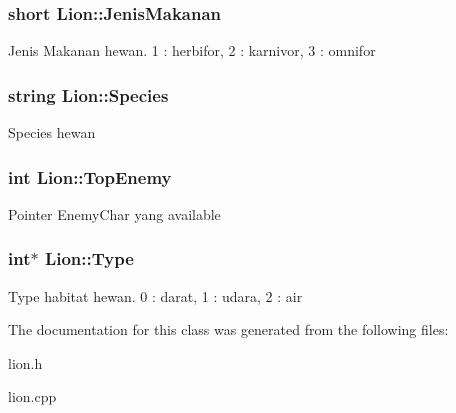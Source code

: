 \subsubsection[{\texorpdfstring{Jenis\+Makanan}{JenisMakanan}}]{\setlength{\rightskip}{0pt plus 5cm}short Lion\+::\+Jenis\+Makanan\hspace{0.3cm}{\ttfamily [protected]}}\hypertarget{class_lion_af7ca474c7731de58af3fef36ec9f2b49}{}\label{class_lion_af7ca474c7731de58af3fef36ec9f2b49}
Jenis Makanan hewan. 1 \+: herbifor, 2 \+: karnivor, 3 \+: omnifor 
\subsubsection[{\texorpdfstring{Species}{Species}}]{\setlength{\rightskip}{0pt plus 5cm}string Lion\+::\+Species\hspace{0.3cm}{\ttfamily [protected]}}\hypertarget{class_lion_a67c8f39f52f6f27bfe84f4a0b61a30d4}{}\label{class_lion_a67c8f39f52f6f27bfe84f4a0b61a30d4}
Species hewan 
\subsubsection[{\texorpdfstring{Top\+Enemy}{TopEnemy}}]{\setlength{\rightskip}{0pt plus 5cm}int Lion\+::\+Top\+Enemy\hspace{0.3cm}{\ttfamily [protected]}}\hypertarget{class_lion_a8ab1c171418a635a5bf1312921ab68d2}{}\label{class_lion_a8ab1c171418a635a5bf1312921ab68d2}
Pointer Enemy\+Char yang available 
\subsubsection[{\texorpdfstring{Type}{Type}}]{\setlength{\rightskip}{0pt plus 5cm}int$\ast$ Lion\+::\+Type\hspace{0.3cm}{\ttfamily [protected]}}\hypertarget{class_lion_ad071035801598be8125e7f68d33cd702}{}\label{class_lion_ad071035801598be8125e7f68d33cd702}
Type habitat hewan. 0 \+: darat, 1 \+: udara, 2 \+: air 

The documentation for this class was generated from the following files\+:\begin{DoxyCompactItemize}
\item 
lion.\+h\item 
lion.\+cpp\end{DoxyCompactItemize}
